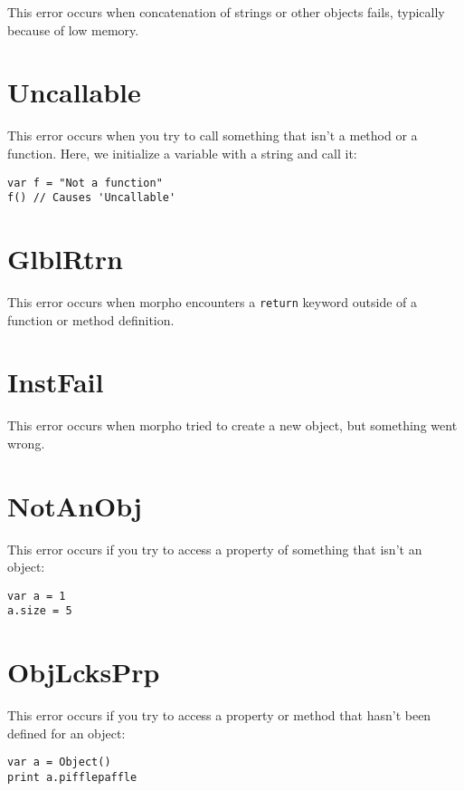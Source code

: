 This error occurs when concatenation of strings or other objects fails,
typically because of low memory.

\hypertarget{uncallable}{%
\section{Uncallable}\label{uncallable}}

This error occurs when you try to call something that isn't a method or
a function. Here, we initialize a variable with a string and call it:

\begin{lstlisting}
var f = "Not a function"
f() // Causes 'Uncallable'
\end{lstlisting}

\hypertarget{glblrtrn}{%
\section{GlblRtrn}\label{glblrtrn}}

This error occurs when morpho encounters a \texttt{return} keyword
outside of a function or method definition.

\hypertarget{instfail}{%
\section{InstFail}\label{instfail}}

This error occurs when morpho tried to create a new object, but
something went wrong.

\hypertarget{notanobj}{%
\section{NotAnObj}\label{notanobj}}

This error occurs if you try to access a property of something that
isn't an object:

\begin{lstlisting}
var a = 1
a.size = 5
\end{lstlisting}

\hypertarget{objlcksprp}{%
\section{ObjLcksPrp}\label{objlcksprp}}

This error occurs if you try to access a property or method that hasn't
been defined for an object:

\begin{lstlisting}
var a = Object()
print a.pifflepaffle
\end{lstlisting}

